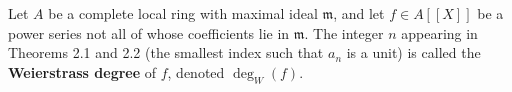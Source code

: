 Let $A$ be a complete local ring with maximal ideal $\mathfrak{m}$, and let $f \in A[[X]]$ be a power series not all of whose coefficients lie in $\mathfrak{m}$. The integer $n$ appearing in Theorems 2.1 and 2.2 (the smallest index such that $a_n$ is a unit) is called the \textbf{Weierstrass degree} of $f$, denoted $\deg_W(f)$.
